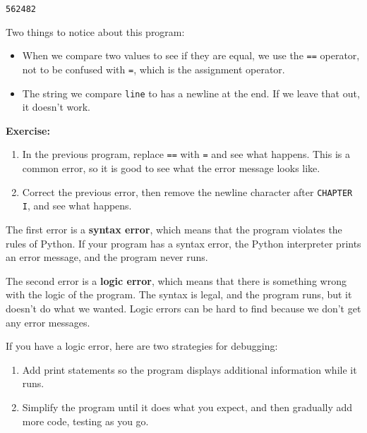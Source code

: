 \begin{lstlisting}[style=output]
562482
\end{lstlisting}

Two things to notice about this program:

\begin{itemize}
\item
  When we compare two values to see if they are equal, we use the
  \passthrough{\lstinline!==!} operator, not to be confused with
  \passthrough{\lstinline!=!}, which is the assignment operator.
\item
  The string we compare \passthrough{\lstinline!line!} to has a newline
  at the end. If we leave that out, it doesn't work.
\end{itemize}

\textbf{Exercise:}

\begin{enumerate}
\def\labelenumi{\arabic{enumi}.}
\item
  In the previous program, replace \passthrough{\lstinline!==!} with
  \passthrough{\lstinline!=!} and see what happens. This is a common
  error, so it is good to see what the error message looks like.
\item
  Correct the previous error, then remove the newline character after
  \passthrough{\lstinline!CHAPTER I!}, and see what happens.
\end{enumerate}

The first error is a \textbf{syntax error}, which means that the program
violates the rules of Python. If your program has a syntax error, the
Python interpreter prints an error message, and the program never runs.

The second error is a \textbf{logic error}, which means that there is
something wrong with the logic of the program. The syntax is legal, and
the program runs, but it doesn't do what we wanted. Logic errors can be
hard to find because we don't get any error messages.

If you have a logic error, here are two strategies for debugging:

\begin{enumerate}
\def\labelenumi{\arabic{enumi}.}
\item
  Add print statements so the program displays additional information
  while it runs.
\item
  Simplify the program until it does what you expect, and then gradually
  add more code, testing as you go.
\end{enumerate}

